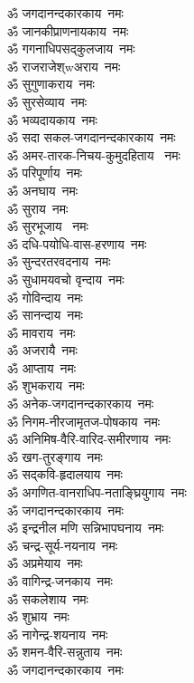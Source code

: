 \begin{flushleft}
\begin{multicols}{2}
ॐ जगदानन्दकारकाय~नमः\\
ॐ जानकीप्राणनायकाय~नमः\\
ॐ गगनाधिपसद्कुलजाय~नमः\\
ॐ राजराजेश्wअराय~नमः\\
ॐ सुगुणाकराय~नमः\\
ॐ सुरसेव्याय~नमः\\
ॐ भव्यदायकाय~नमः\\
ॐ सदा सकल-जगदानन्दकारकाय~नमः\\
ॐ अमर-तारक-निचय-कुमुदहिताय ~नमः\\
ॐ परिपूर्णाय~नमः\hfill{}\\
ॐ अनघाय~नमः\\
ॐ सुराय~नमः\\
ॐ सुरभूजाय ~नमः\\
ॐ दधि-पयोधि-वास-हरणाय~नमः\\
ॐ सुन्दरतरवदनाय~नमः\\
ॐ सुधामयवचो वृन्दाय~नमः\\
ॐ गोविन्दाय~नमः\\
ॐ सानन्दाय~नमः\\
ॐ मावराय~नमः\\
ॐ अजरायै~नमः\hfill{}\\
ॐ आप्ताय~नमः\\
ॐ शुभकराय~नमः\\
ॐ अनेक-जगदानन्दकारकाय~नमः\\
ॐ निगम-नीरजामृतज-पोषकाय~नमः\\
ॐ अनिमिष-वैरि-वारिद-समीरणाय~नमः\\
ॐ खग-तुरङ्गाय~नमः\\
ॐ सद्कवि-हृदालयाय~नमः\\
ॐ अगणित-वानराधिप-नताङ्घ्रियुगाय~नमः\\
ॐ जगदानन्दकारकाय~नमः\\
ॐ इन्द्रनील मणि सन्निभापघनाय~नमः\hfill{}\\
ॐ चन्द्र-सूर्य-नयनाय~नमः\\
ॐ अप्रमेयाय~नमः\\
ॐ वागिन्द्र-जनकाय~नमः\\
ॐ सकलेशाय~नमः\\
ॐ शुभ्राय~नमः\\
ॐ नागेन्द्र-शयनाय~नमः\\
ॐ शमन-वैरि-सन्नुताय~नमः\\
ॐ जगदानन्दकारकाय~नमः\\

\end{multicols}
\end{flushleft}
